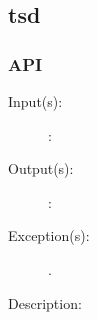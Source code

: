 %
%
%
%
%              

\subsection{tsd}
\label{tsd}

\subsubsection{API}
\begin{description}
\label{tsd_}
\item[{\cfunc[]{tsd\_}{}}: ]
	\begin{description}\item[]
	\item[Input(s): ]
		\begin{description}\item[]
		\item[: ]
		\end{description}
	\item[Output(s): ]
		\begin{description}\item[]
		\item[: ]
		\end{description}
	\item[Exception(s): ]
		\begin{description}\item[]
		\item[.]
		\end{description}
	\item[Description: ]
	\end{description}
\end{description}
